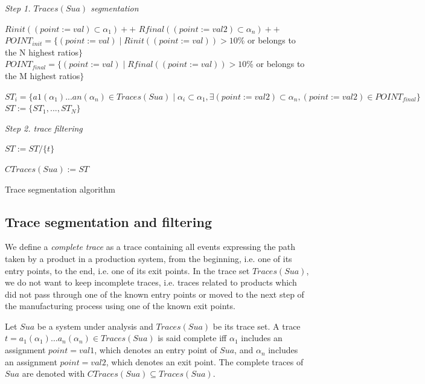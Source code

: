 \begin{algorithm}


\BlankLine
\emph{Step 1. $Traces(Sua)$ segmentation}

 {
$Rinit((point:=val)\subset \alpha_1)++$\;
$Rfinal((point:=val2)\subset \alpha_n)++$\;
}
$POINT_{init}=\{(point:=val) \mid Rinit((point:=val))>10$\% or belongs to the N highest ratios$\}$\;
$POINT_{final}=\{(point:=val) \mid Rfinal((point:=val))>10$\% or belongs to the M highest ratios$\}$\;
\BlankLine

 {
	$ST_i=\{a1(\alpha_1)...an(\alpha_n)\in Traces(Sua) \mid \alpha_i\subset \alpha_1, \exists (point:=val2)\subset \alpha_n, (point:=val2)\in POINT_{final}    \}$\;
}
$ST:=\{ST_1,...,ST_N\}$\;

\BlankLine
\emph{Step 2. trace filtering}

 {
	{
		$ST:= ST/ \{  t \}$\;
	}


	}

    $CTraces(Sua) := ST$

\caption{Trace segmentation algorithm}
\label{algo_traces}
\end{algorithm}

\subsection{Trace segmentation and filtering}
\label{sec:modelinf:prodsystems:segmentation}

We define a \textit{complete trace} as a trace containing all
events expressing the path taken by a product in a production
system, from the beginning, i.e. one of its entry points, to the
end, i.e. one of its exit points. In the trace set $Traces(Sua)$,
we do not want to keep incomplete traces, i.e. traces related to
products which did not pass through one of the known entry points
or moved to the next step of the manufacturing process using one
of the known exit points.

\begin{definition}
Let $\mathit{Sua}$ be a system under analysis and $Traces({Sua})$
be its trace set. A trace $t=a_1(\alpha_1) \dots a_n(\alpha_n) \in
Traces({Sua})$ is said complete iff $\alpha_1$ includes an
assignment $point=val1$, which denotes an entry point of
$\mathit{Sua}$, and $\alpha_n$ includes an assignment
$point=val2$, which denotes an exit point.  The complete traces
of $\mathit{Sua}$ are denoted with $CTraces({Sua}) \subseteq
Traces({Sua})$.
\end{definition}


